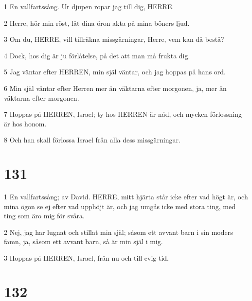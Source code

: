 \par 1 En vallfartssång. Ur djupen ropar jag till dig, HERRE.
\par 2 Herre, hör min röst, låt dina öron akta på mina böners ljud.
\par 3 Om du, HERRE, vill tillräkna missgärningar, Herre, vem kan då bestå?
\par 4 Dock, hos dig är ju förlåtelse, på det att man må frukta dig.
\par 5 Jag väntar efter HERREN, min själ väntar, och jag hoppas på hans ord.
\par 6 Min själ väntar efter Herren mer än väktarna efter morgonen, ja, mer än väktarna efter morgonen.
\par 7 Hoppas på HERREN, Israel; ty hos HERREN är nåd, och mycken förlossning är hos honom.
\par 8 Och han skall förlossa Israel från alla dess missgärningar.

\chapter{131}

\par 1 En vallfartssång; av David. HERRE, mitt hjärta står icke efter vad högt är, och mina ögon se ej efter vad upphöjt är, och jag umgås icke med stora ting, med ting som äro mig för svåra.
\par 2 Nej, jag har lugnat och stillat min själ; såsom ett avvant barn i sin moders famn, ja, såsom ett avvant barn, så är min själ i mig.
\par 3 Hoppas på HERREN, Israel, från nu och till evig tid.

\chapter{132}

